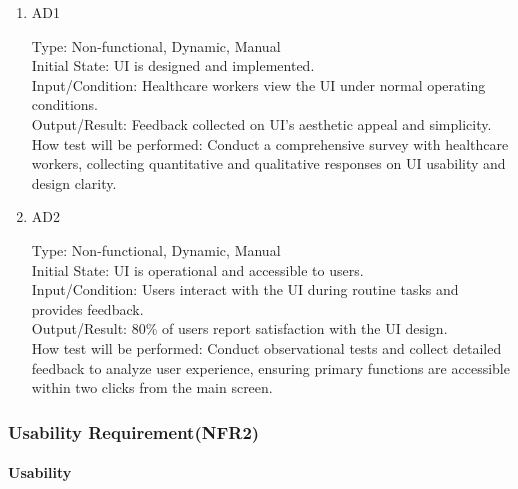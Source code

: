 \documentclass[12pt, titlepage]{article}
\begin{document}
\begin{enumerate}
    \item{AD1\\}
    
    Type: Non-functional, Dynamic, Manual\\
    
    Initial State: UI is designed and implemented.\\
    
    Input/Condition: Healthcare workers view the UI under normal operating conditions.\\
    
    Output/Result: Feedback collected on UI’s aesthetic appeal and simplicity.\\
    
    How test will be performed: Conduct a comprehensive survey with healthcare workers, collecting quantitative and qualitative responses on UI usability and design clarity.

    \item{AD2\\}
    
    Type: Non-functional, Dynamic, Manual\\
    
    Initial State: UI is operational and accessible to users.\\
    
    Input/Condition: Users interact with the UI during routine tasks and provides feedback.\\
    
    Output/Result: 80\% of users report satisfaction with the UI design.\\
    
    How test will be performed: Conduct observational tests and collect detailed feedback to analyze user experience, ensuring primary functions are accessible within two clicks from the main screen. 
\end{enumerate}

\subsubsection{Usability Requirement(NFR2)}

\paragraph{Usability}
\end{document}
